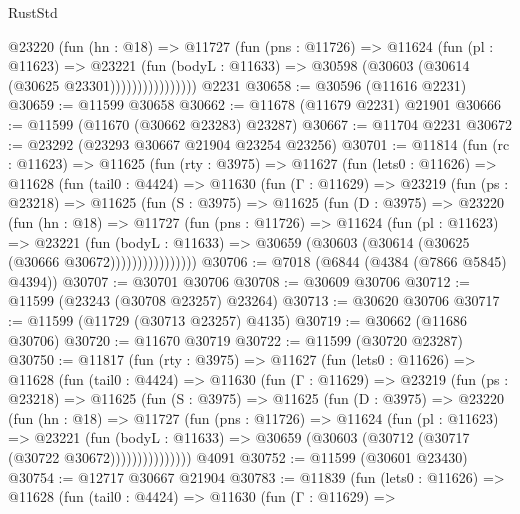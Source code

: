 \begin{lexlean}{RustStd}
\begin{coremodule}
                    @23220
                      (fun (hn : @18) =>
                      @11727
                        (fun (pns : @11726) =>
                        @11624
                          (fun (pl : @11623) =>
                          @23221
                            (fun (bodyL : @11633) =>
                            @30598 (@30603 (@30614 (@30625 @23301))))))))))))))))
    @2231
@30658 := @30596 (@11616 @2231)
@30659 := @11599 @30658
@30662 := @11678 (@11679 @2231) @21901
@30666 := @11599 (@11670 (@30662 @23283) @23287)
@30667 := @11704 @2231
@30672 := @23292 (@23293 @30667 @21904 @23254 @23256)
@30701 := @11814
    (fun (rc : @11623) =>
    @11625
      (fun (rty : @3975) =>
      @11627
        (fun (lets0 : @11626) =>
        @11628
          (fun (tail0 : @4424) =>
          @11630
            (fun (Γ : @11629) =>
            @23219
              (fun (ps : @23218) =>
              @11625
                (fun (S : @3975) =>
                @11625
                  (fun (D : @3975) =>
                  @23220
                    (fun (hn : @18) =>
                    @11727
                      (fun (pns : @11726) =>
                      @11624
                        (fun (pl : @11623) =>
                        @23221
                          (fun (bodyL : @11633) =>
                          @30659 (@30603 (@30614 (@30625 (@30666 @30672))))))))))))))))
@30706 := @7018 (@6844 (@4384 (@7866 @5845) @4394))
@30707 := @30701 @30706
@30708 := @30609 @30706
@30712 := @11599 (@23243 (@30708 @23257) @23264)
@30713 := @30620 @30706
@30717 := @11599 (@11729 (@30713 @23257) @4135)
@30719 := @30662 (@11686 @30706)
@30720 := @11670 @30719
@30722 := @11599 (@30720 @23287)
@30750 := @11817
    (fun (rty : @3975) =>
    @11627
      (fun (lets0 : @11626) =>
      @11628
        (fun (tail0 : @4424) =>
        @11630
          (fun (Γ : @11629) =>
          @23219
            (fun (ps : @23218) =>
            @11625
              (fun (S : @3975) =>
              @11625
                (fun (D : @3975) =>
                @23220
                  (fun (hn : @18) =>
                  @11727
                    (fun (pns : @11726) =>
                    @11624
                      (fun (pl : @11623) =>
                      @23221
                        (fun (bodyL : @11633) =>
                        @30659 (@30603 (@30712 (@30717 (@30722 @30672)))))))))))))))
    @4091
@30752 := @11599 (@30601 @23430)
@30754 := @12717 @30667 @21904
@30783 := @11839
    (fun (lets0 : @11626) =>
    @11628
      (fun (tail0 : @4424) =>
      @11630
        (fun (Γ : @11629) =>

\end{coremodule}
\end{lexlean}
